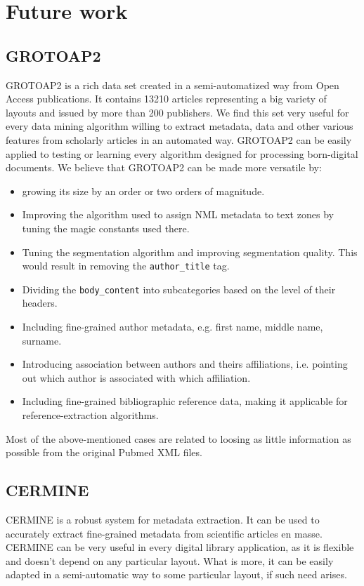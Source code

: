 \clearpage
\restoregeometry
\section{Future work}
\subsection{GROTOAP2}
GROTOAP2 is a rich data set created in a semi-automatized way from Open Access publications. It contains 13210 articles representing a big variety of layouts and issued by more than 200 publishers. We find this set very useful for every data mining algorithm willing to extract metadata, data and other various features from scholarly articles in an automated way. GROTOAP2 can be easily applied to testing or learning every algorithm designed for processing born-digital documents.
\quad
We believe that GROTOAP2 can be made more versatile by:
\begin{itemize}
\item growing its size by an order or two orders of magnitude.
\item Improving the algorithm used to assign NML metadata to text zones by tuning the magic constants used there.
\item Tuning the segmentation algorithm and improving segmentation quality. This would result in removing the \verb+author_title+ tag.
\item Dividing the \verb+body_content+ into subcategories based on the level of their headers.
\item Including fine-grained author metadata, e.g. first name, middle name, surname.
\item Introducing association between authors and theirs affiliations, i.e. pointing out which author is associated with which affiliation.
\item Including fine-grained bibliographic reference data, making it applicable for reference-extraction algorithms.
\end{itemize}
Most of the above-mentioned cases are related to loosing as little information as possible from the original Pubmed XML files.

\subsection{CERMINE}
CERMINE is a robust system for metadata extraction. It can be used to accurately extract fine-grained metadata from scientific articles en masse. CERMINE can be very useful in every digital library application, as it is flexible and doesn't depend on any particular layout. What is more, it can be easily adapted in a semi-automatic way to some particular layout, if such need arises.


